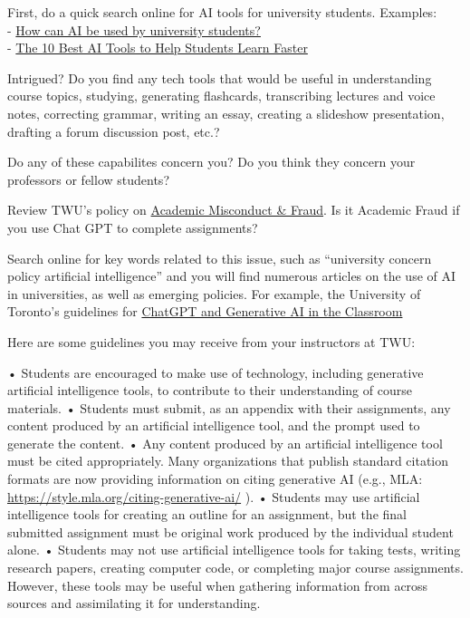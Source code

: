 \documentclass[
]{book}
\theoremstyle{definition}
\theoremstyle{definition}
\theoremstyle{definition}
\theoremstyle{definition}
\theoremstyle{remark}
\begin{document}
\begin{reflect}
First, do a quick search online for AI tools for university students.
Examples:\\
- \href{https://www.timeshighereducation.com/student/advice/how-can-ai-be-used-university-students}{How can AI be used by university students?}\\
- \href{https://mystudylife.com/10-best-ai-tools-to-help-students-learn-faster/}{The 10 Best AI Tools to Help Students Learn Faster}

Intrigued? Do you find any tech tools that would be useful in understanding course topics, studying, generating flashcards, transcribing lectures and voice notes, correcting grammar, writing an essay, creating a slideshow presentation, drafting a forum discussion post, etc.?

Do any of these capabilites concern you? Do you think they concern your professors or fellow students?

Review TWU's policy on \href{https://www.twu.ca/about-us/policies-guidelines/university-policies/academic-misconduct-fraud}{Academic Misconduct \& Fraud}. Is it Academic Fraud if you use Chat GPT to complete assignments?

Search online for key words related to this issue, such as ``university concern policy artificial intelligence'' and you will find numerous articles on the use of AI in universities, as well as emerging policies. For example, the University of Toronto's guidelines for \href{https://www.viceprovostundergrad.utoronto.ca/strategic-priorities/digital-learning/special-initiative-artificial-intelligence/}{ChatGPT and Generative AI in the Classroom}

Here are some guidelines you may receive from your instructors at TWU:

• Students are encouraged to make use of technology, including generative artificial intelligence
tools, to contribute to their understanding of course materials.
• Students must submit, as an appendix with their assignments, any content produced by an
artificial intelligence tool, and the prompt used to generate the content.
• Any content produced by an artificial intelligence tool must be cited appropriately. Many
organizations that publish standard citation formats are now providing information on citing
generative AI (e.g., MLA: \url{https://style.mla.org/citing-generative-ai/} ).
• Students may use artificial intelligence tools for creating an outline for an assignment, but the
final submitted assignment must be original work produced by the individual student alone.
• Students may not use artificial intelligence tools for taking tests, writing research papers,
creating computer code, or completing major course assignments. However, these tools may be
useful when gathering information from across sources and assimilating it for understanding.


\end{reflect}
\end{document}
